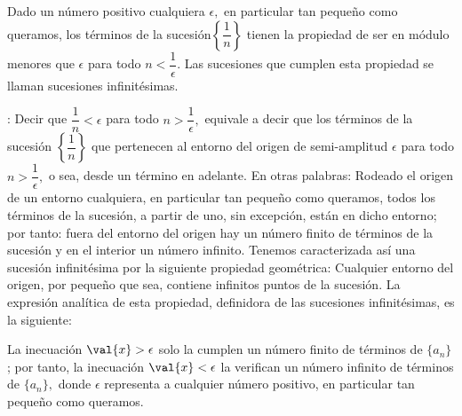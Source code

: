 \conclu Dado un número positivo cualquiera $\epsilon,$ en particular
tan pequeño como queramos, los términos de la sucesión$\left\{ \dfrac{1}{n}\right\} $
tienen la propiedad de ser en módulo menores que $\epsilon$ para
todo $n<\dfrac{1}{\epsilon}.$ Las sucesiones que cumplen esta propiedad
se llaman sucesiones infinitésimas.

: Decir que $\dfrac{1}{n}<\epsilon$
para todo $n>\dfrac{1}{\epsilon},$ equivale a decir que los términos
de la sucesión $\left\{ \dfrac{1}{n}\right\} $ que pertenecen al
entorno del origen de semi-amplitud $\epsilon$ para todo $n>\dfrac{1}{\epsilon},$
o sea, desde un término en adelante. En otras palabras: Rodeado el
origen de un entorno cualquiera, en particular tan pequeño como queramos,
todos los términos de la sucesión, a partir de uno, sin excepción,
están en dicho entorno; por tanto: fuera del entorno del origen hay
un número finito de términos de la sucesión y en el interior un número
infinito. Tenemos caracterizada así una sucesión infinitésima por
la siguiente propiedad geométrica: Cualquier entorno del origen, por
pequeño que sea, contiene infinitos puntos de la sucesión. La expresión
analítica de esta propiedad, definidora de las sucesiones infinitésimas,
es la siguiente: 

La inecuación $\val{x}>\epsilon$ solo la cumplen un número finito
de términos de $\{a_{n}\}$; por tanto, la inecuación $\val{x}<\epsilon$
la verifican un número infinito de términos de $\{a_{n}\},$ donde
$\epsilon$ representa a cualquier número positivo, en particular
tan pequeño como queramos. 

